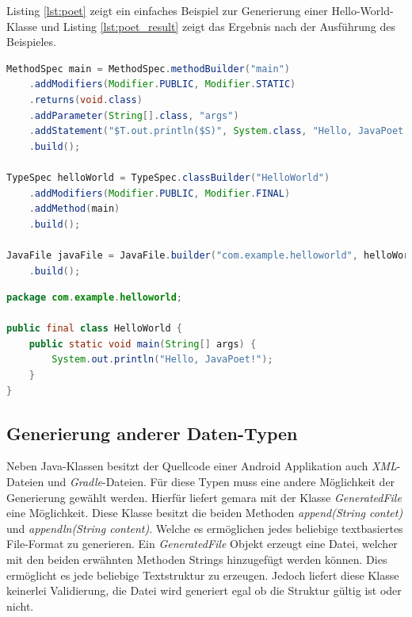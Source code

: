 Listing \ref{lst:poet} zeigt ein einfaches Beispiel zur Generierung einer Hello-World-Klasse und Listing \ref{lst:poet_result} zeigt das Ergebnis nach der Ausführung des Beispieles.

\begin{lstlisting}[label=lst:poet,
language=java,
firstnumber=1,
caption=Beispiel für die Generation einer Hallo-World-Klasse \cite{poet}.]				   
MethodSpec main = MethodSpec.methodBuilder("main")
	.addModifiers(Modifier.PUBLIC, Modifier.STATIC)
	.returns(void.class)
	.addParameter(String[].class, "args")
	.addStatement("$T.out.println($S)", System.class, "Hello, JavaPoet!")
	.build();

TypeSpec helloWorld = TypeSpec.classBuilder("HelloWorld")
	.addModifiers(Modifier.PUBLIC, Modifier.FINAL)
	.addMethod(main)
	.build();

JavaFile javaFile = JavaFile.builder("com.example.helloworld", helloWorld)
	.build();
\end{lstlisting}

\begin{lstlisting}[label=lst:poet_result,
language=java,
firstnumber=1,
caption=Ergebnis der Generation von Listing \ref{lst:poet} \cite{poet}.]				   
package com.example.helloworld;

public final class HelloWorld {
	public static void main(String[] args) {
		System.out.println("Hello, JavaPoet!");
	}
}
\end{lstlisting}

\subsection{Generierung anderer Daten-Typen}

Neben Java-Klassen besitzt der Quellcode einer Android Applikation auch \textit{XML}-Dateien und \textit{Gradle}-Dateien. Für diese Typen muss eine andere Möglichkeit der Generierung gewählt werden. Hierfür liefert \acf{gemara} mit der Klasse \textit{GeneratedFile} eine Möglichkeit. Diese Klasse besitzt die beiden Methoden \textit{append(String contet)} und \textit{appendln(String content)}. Welche es ermöglichen jedes beliebige textbasiertes File-Format zu generieren. Ein \textit{GeneratedFile} Objekt erzeugt eine Datei, welcher mit den beiden erwähnten Methoden Strings hinzugefügt werden können. Dies ermöglicht es jede beliebige Textstruktur zu erzeugen. Jedoch liefert diese Klasse keinerlei Validierung, die Datei wird generiert egal ob die Struktur gültig ist oder nicht.

